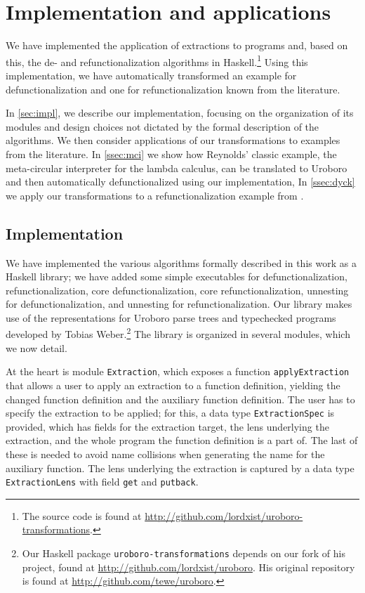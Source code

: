 \chapter{Implementation and applications}
\label{ch:impl}

We have implemented the application of extractions to programs and, based on this, the de- and refunctionalization algorithms in Haskell.\footnote{The source code is found at \url{http://github.com/lordxist/uroboro-transformations}.} Using this implementation, we have automatically transformed an example for defunctionalization and one for refunctionalization known from the literature.

In \autoref{sec:impl}, we describe our implementation, focusing on the organization of its modules and design choices not dictated by the formal description of the algorithms. We then consider applications of our transformations to examples from the literature. In \autoref{ssec:mci} we show how Reynolds' classic example, the meta-circular interpreter for the lambda calculus\citep{reynolds72definitional}, can be translated to Uroboro and then automatically defunctionalized using our implementation, In \autoref{ssec:dyck} we apply our transformations to a refunctionalization example from \citet{danvy09refunctionalization}.

\section{Implementation}
\label{sec:impl}

We have implemented the various algorithms formally described in this work as a Haskell library; we have added some simple executables for defunctionalization, refunctionalization, core defunctionalization, core refunctionalization, unnesting for defunctionalization, and unnesting for refunctionalization. Our library makes use of the representations for Uroboro parse trees and typechecked programs developed by Tobias Weber.\footnote{Our Haskell package \texttt{uroboro-transformations} depends on our fork of his project, found at \url{http://github.com/lordxist/uroboro}. His original repository is found at \url{http://github.com/tewe/uroboro}.} The library is organized in several modules, which we now detail.

At the heart is module \texttt{Extraction}, which exposes a function \texttt{applyExtraction} that allows a user to apply an extraction to a function definition, yielding the changed function definition and the auxiliary function definition. The user has to specify the extraction to be applied; for this, a data type \texttt{ExtractionSpec} is provided, which has fields for the extraction target, the lens underlying the extraction, and the whole program the function definition is a part of. The last of these is needed to avoid name collisions when generating the name for the auxiliary function. The lens underlying the extraction is captured by a data type \texttt{ExtractionLens} with field \texttt{get} and \texttt{putback}.

